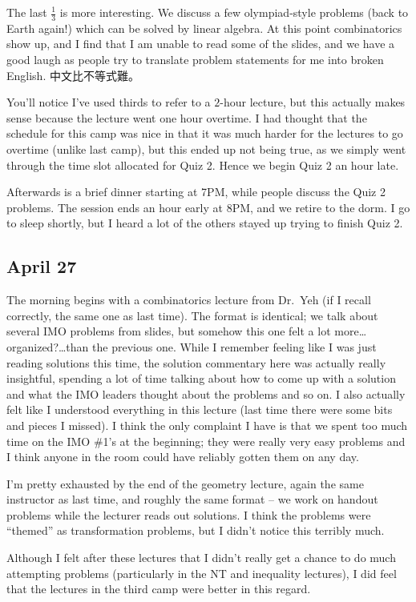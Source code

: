 \documentclass[11pt]{scrreprt}
\begin{document}
The last $\frac 13$ is more interesting. We discuss a few olympiad-style problems (back to Earth again!) which can be solved by linear algebra. At this point combinatorics show up, and I find that I am unable to read some of the slides, and we have a good laugh as people try to translate problem statements for me into broken English. 中文比不等式難。

You'll notice I've used thirds to refer to a $2$-hour lecture, but this actually makes sense because the lecture went one hour overtime. I had thought that the schedule for this camp was nice in that it was much harder for the lectures to go overtime (unlike last camp), but this ended up not being true, as we simply went through the time slot allocated for Quiz 2. Hence we begin Quiz 2 an hour late.

Afterwards is a brief dinner starting at 7PM, while people discuss the Quiz 2 problems. The session ends an hour early at 8PM, and we retire to the dorm. I go to sleep shortly, but I heard a lot of the others stayed up trying to finish Quiz 2.

\subsection{April 27}
The morning begins with a combinatorics lecture from Dr.\ Yeh (if I recall correctly, the same one as last time). The format is identical; we talk about several IMO problems from slides, but somehow this one felt a lot more\dots organized?\dots than the previous one.
While I remember feeling like I was just reading solutions this time, the solution commentary here was actually really insightful, spending a lot of time talking about how to come up with a solution and what the IMO leaders thought about the problems and so on.
I also actually felt like I understood everything in this lecture (last time there were some bits and pieces I missed).
I think the only complaint I have is that we spent too much time on the IMO \#1's at the beginning; they were really very easy problems and I think anyone in the room could have reliably gotten them on any day.

I'm pretty exhausted by the end of the geometry lecture, again the same instructor as last time, and roughly the same format -- we work on handout problems while the lecturer reads out solutions. I think the problems were ``themed'' as transformation problems, but I didn't notice this terribly much.

Although I felt after these lectures that I didn't really get a chance to do much attempting problems (particularly in the NT and inequality lectures), I did feel that the lectures in the third camp were better in this regard.
\end{document}
